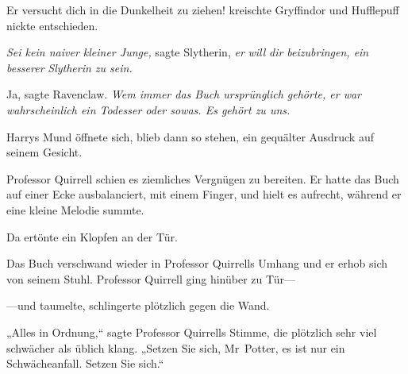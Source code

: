 {%
Er versucht dich in die Dunkelheit zu ziehen! kreischte Gryffindor und Hufflepuff nickte entschieden.

\emph{Sei kein naiver kleiner Junge,} sagte Slytherin, \emph{er} \emph{will} \emph{dir beizubringen, ein} \emph{besserer} \emph{Slytherin zu sein.}

Ja, sagte Ravenclaw. \emph{Wem immer das Buch ursprünglich gehörte, er war wahrscheinlich ein Todesser oder sowas. Es gehört zu uns.}

Harrys Mund öffnete sich, blieb dann so stehen, ein gequälter Ausdruck auf seinem Gesicht.

Professor Quirrell schien es ziemliches Vergnügen zu bereiten. Er hatte das Buch auf einer Ecke ausbalanciert, mit einem Finger, und hielt es aufrecht, während er eine kleine Melodie summte.

Da ertönte ein Klopfen an der Tür.

Das Buch verschwand wieder in Professor Quirrells Umhang und er erhob sich von seinem Stuhl. Professor Quirrell ging hinüber zu Tür—

—und taumelte, schlingerte plötzlich gegen die Wand.

„Alles in Ordnung,“ sagte Professor Quirrells Stimme, die plötzlich sehr viel schwächer als üblich klang. „Setzen Sie sich, Mr~Potter, es ist nur ein Schwächeanfall. Setzen Sie sich.“

}
